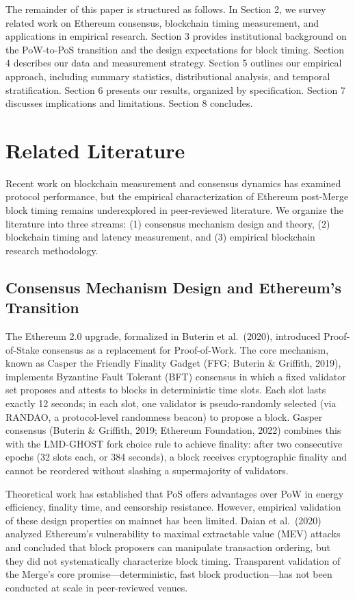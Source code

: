 \documentclass[12pt]{article}
\begin{document}
The remainder of this paper is structured as follows. In Section 2, we survey related work on Ethereum consensus, blockchain timing measurement, and applications in empirical research. Section 3 provides institutional background on the PoW-to-PoS transition and the design expectations for block timing. Section 4 describes our data and measurement strategy. Section 5 outlines our empirical approach, including summary statistics, distributional analysis, and temporal stratification. Section 6 presents our results, organized by specification. Section 7 discusses implications and limitations. Section 8 concludes.

\section{Related Literature}

Recent work on blockchain measurement and consensus dynamics has examined protocol performance, but the empirical characterization of Ethereum post-Merge block timing remains underexplored in peer-reviewed literature. We organize the literature into three streams: (1) consensus mechanism design and theory, (2) blockchain timing and latency measurement, and (3) empirical blockchain research methodology.

\subsection{Consensus Mechanism Design and Ethereum's Transition}

The Ethereum 2.0 upgrade, formalized in Buterin et al.~(2020), introduced Proof-of-Stake consensus as a replacement for Proof-of-Work. The core mechanism, known as Casper the Friendly Finality Gadget (FFG; Buterin \& Griffith, 2019), implements Byzantine Fault Tolerant (BFT) consensus in which a fixed validator set proposes and attests to blocks in deterministic time slots. Each slot lasts exactly 12 seconds; in each slot, one validator is pseudo-randomly selected (via RANDAO, a protocol-level randomness beacon) to propose a block. Gasper consensus (Buterin \& Griffith, 2019; Ethereum Foundation, 2022) combines this with the LMD-GHOST fork choice rule to achieve finality: after two consecutive epochs (32 slots each, or 384 seconds), a block receives cryptographic finality and cannot be reordered without slashing a supermajority of validators.

Theoretical work has established that PoS offers advantages over PoW in energy efficiency, finality time, and censorship resistance. However, empirical validation of these design properties on mainnet has been limited. Daian et al.~(2020) analyzed Ethereum's vulnerability to maximal extractable value (MEV) attacks and concluded that block proposers can manipulate transaction ordering, but they did not systematically characterize block timing. Transparent validation of the Merge's core promise—deterministic, fast block production—has not been conducted at scale in peer-reviewed venues.
\end{document}
